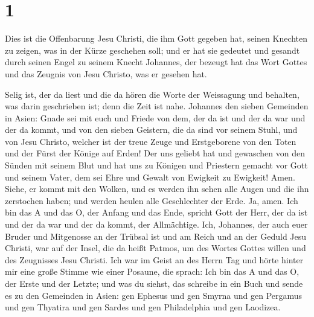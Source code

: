 \hypertarget{section}{%
\section{1}\label{section}}

 Dies ist die Offenbarung Jesu Christi, die ihm Gott
gegeben hat, seinen Knechten zu zeigen, was in der Kürze geschehen soll;
und er hat sie gedeutet und gesandt durch seinen Engel zu seinem Knecht
Johannes,  der bezeugt hat das Wort Gottes und das Zeugnis
von Jesu Christo, was er gesehen hat.

 Selig ist, der da liest und die da hören die Worte der
Weissagung und behalten, was darin geschrieben ist; denn die Zeit ist
nahe.  Johannes den sieben Gemeinden in Asien: Gnade sei
mit euch und Friede von dem, der da ist und der da war und der da kommt,
und von den sieben Geistern, die da sind vor seinem Stuhl,
 und von Jesu Christo, welcher ist der treue Zeuge und
Erstgeborene von den Toten und der Fürst der Könige auf Erden! Der uns
geliebt hat und gewaschen von den Sünden mit seinem Blut 
und hat uns zu Königen und Priestern gemacht vor Gott und seinem Vater,
dem sei Ehre und Gewalt von Ewigkeit zu Ewigkeit! Amen. 
Siehe, er kommt mit den Wolken, und es werden ihn sehen alle Augen und
die ihn zerstochen haben; und werden heulen alle Geschlechter der Erde.
Ja, amen.  Ich bin das A und das O, der Anfang und das
Ende, spricht Gott der Herr, der da ist und der da war und der da kommt,
der Allmächtige.  Ich, Johannes, der auch euer Bruder und
Mitgenosse an der Trübsal ist und am Reich und an der Geduld Jesu
Christi, war auf der Insel, die da heißt Patmos, um des Wortes Gottes
willen und des Zeugnisses Jesu Christi.  Ich war im Geist
an des Herrn Tag und hörte hinter mir eine große Stimme wie einer
Posaune,  die sprach: Ich bin das A und das O, der Erste
und der Letzte; und was du siehst, das schreibe in ein Buch und sende es
zu den Gemeinden in Asien: gen Ephesus und gen Smyrna und gen Pergamus
und gen Thyatira und gen Sardes und gen Philadelphia und gen Laodizea.

